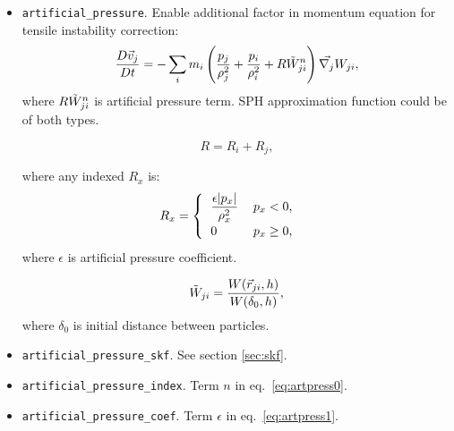 \begin{itemize}
    \item \verb|artificial_pressure|. Enable additional factor in momentum equation for tensile instability correction:
    \begin{equation}\label{eq:artpress0}
        \frac{D\vec{v}_j}{D t} = 
        -\sum\limits_{i} m_{i} 
        \left(
        \frac{p_{j}}{\rho_{j}^{2}} + 
        \frac{p_{i}}{\rho_{i}^{2}} +
        R\Tilde{W}_{ji}^{n}
        \right) \vec{\nabla_{j}} W_{ji},
    \end{equation}
    where $R\Tilde{W}_{ji}^{n}$ is artificial pressure term. SPH approximation function could be of both types.
    
    \begin{equation}
        R = R_{i} + R_{j},
    \end{equation}

    where any indexed $R_{x}$ is:
    \begin{equation}\label{eq:artpress1}
        R_{x} = 
        \begin{cases}
          \begin{tabular}{l l}
              $\displaystyle{
              \frac{\epsilon|p_{x}|}{\rho_{x}^{2}}
              }$
              &
              $p_{x} < 0$, 
              
              \\
              
              0
              &
              $p_{x} \geq 0$,
          \end{tabular}  
        \end{cases} 
    \end{equation}
    where $\epsilon$ is artificial pressure coefficient.
    
    \begin{equation}
        \Tilde{W}_{ji} = \frac{W(\vec{r}_{ji}, h)}{W(\delta_{0}, h)},
    \end{equation}
    where $\delta_{0}$ is initial distance between particles.

    \item \verb|artificial_pressure_skf|. See section \ref{sec:skf}.
    \item \verb|artificial_pressure_index|. Term $n$ in eq.~\ref{eq:artpress0}.
    \item \verb|artificial_pressure_coef|. Term $\epsilon$ in eq.~\ref{eq:artpress1}.
\end{itemize}


